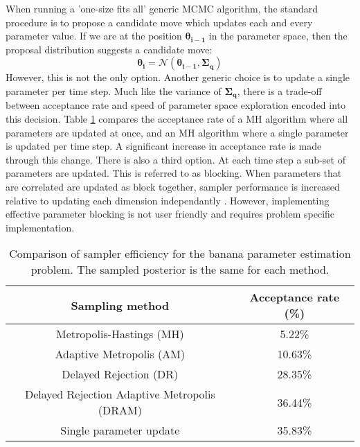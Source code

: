 When running a 'one-size fits all' generic MCMC algorithm, the standard procedure is to propose a candidate move which updates each and every parameter value. If we are at the position $\bm{\theta_{i-1}}$ in the parameter space, then the proposal distribution suggests a candidate move:
\begin{equation}
	\bm{\theta_{i}} = \mathcal{N}(\bm{\theta_{i-1}},\bm{\Sigma_q})
\end{equation}
However, this is not the only option. Another generic choice is to update a single parameter per time step. Much like the variance of $\bm{\Sigma_q}$, there is a trade-off between acceptance rate and speed of parameter space exploration encoded into this decision. Table \ref{sampling-method-comparison} compares the acceptance rate of a MH algorithm where all parameters are updated at once, and an MH algorithm where a single parameter is updated per time step. A significant increase in acceptance rate is made through this change. There is also a third option. At each time step a sub-set of parameters are updated. This is referred to as blocking. When parameters that are correlated are updated as block together, sampler performance is increased relative to updating each dimension independantly \citep{Turek2017}. However, implementing effective parameter blocking is not user friendly and requires problem specific implementation. 

\begin{table}[H]
	\centering
	\begin{tabular}{|c|c|}
	\hline
	Sampling method & Acceptance rate (\%) \\
	\hline
	Metropolis-Hastings (MH) & 5.22\% \\
	\hline
	Adaptive Metropolis (AM) & 10.63\% \\
	\hline
	Delayed Rejection (DR) & 28.35\% \\
	\hline
	Delayed Rejection Adaptive Metropolis (DRAM) & 36.44\% \\
	\hline
	Single parameter update & 35.83\% \\
	\hline
	\end{tabular}
	\caption{Comparison of sampler efficiency for the banana parameter estimation problem. The sampled posterior is the same for each method.}
	\label{sampling-method-comparison}
\end{table}

